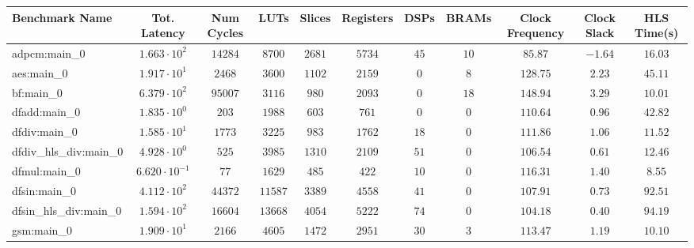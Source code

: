 \begin{tabular}{|l|c|c|c|c|c|c|c|c|c|c|}
\hline
Benchmark Name          & Tot. Latency            & Num Cycles & LUTs      & Slices    & Registers & DSPs    & BRAMs   & Clock Frequency & Clock Slack & HLS Time(s) \\
\hline
adpcm:main\_0           & $ 1.663 \cdot 10^{2}  $ & $ 14284  $ & $ 8700  $ & $ 2681  $ & $ 5734  $ & $ 45  $ & $ 10  $ & $ 85.87       $ & $ -1.64   $ & $ 16.03   $ \\
aes:main\_0             & $ 1.917 \cdot 10^{1}  $ & $ 2468   $ & $ 3600  $ & $ 1102  $ & $ 2159  $ & $ 0   $ & $ 8   $ & $ 128.75      $ & $ 2.23    $ & $ 45.11   $ \\
bf:main\_0              & $ 6.379 \cdot 10^{2}  $ & $ 95007  $ & $ 3116  $ & $ 980   $ & $ 2093  $ & $ 0   $ & $ 18  $ & $ 148.94      $ & $ 3.29    $ & $ 10.01   $ \\
dfadd:main\_0           & $ 1.835 \cdot 10^{0}  $ & $ 203    $ & $ 1988  $ & $ 603   $ & $ 761   $ & $ 0   $ & $ 0   $ & $ 110.64      $ & $ 0.96    $ & $ 42.82   $ \\
dfdiv:main\_0           & $ 1.585 \cdot 10^{1}  $ & $ 1773   $ & $ 3225  $ & $ 983   $ & $ 1762  $ & $ 18  $ & $ 0   $ & $ 111.86      $ & $ 1.06    $ & $ 11.52   $ \\
dfdiv\_hls\_div:main\_0 & $ 4.928 \cdot 10^{0}  $ & $ 525    $ & $ 3985  $ & $ 1310  $ & $ 2109  $ & $ 51  $ & $ 0   $ & $ 106.54      $ & $ 0.61    $ & $ 12.46   $ \\
dfmul:main\_0           & $ 6.620 \cdot 10^{-1} $ & $ 77     $ & $ 1629  $ & $ 485   $ & $ 422   $ & $ 10  $ & $ 0   $ & $ 116.31      $ & $ 1.40    $ & $ 8.55    $ \\
dfsin:main\_0           & $ 4.112 \cdot 10^{2}  $ & $ 44372  $ & $ 11587 $ & $ 3389  $ & $ 4558  $ & $ 41  $ & $ 0   $ & $ 107.91      $ & $ 0.73    $ & $ 92.51   $ \\
dfsin\_hls\_div:main\_0 & $ 1.594 \cdot 10^{2}  $ & $ 16604  $ & $ 13668 $ & $ 4054  $ & $ 5222  $ & $ 74  $ & $ 0   $ & $ 104.18      $ & $ 0.40    $ & $ 94.19   $ \\
gsm:main\_0             & $ 1.909 \cdot 10^{1}  $ & $ 2166   $ & $ 4605  $ & $ 1472  $ & $ 2951  $ & $ 30  $ & $ 3   $ & $ 113.47      $ & $ 1.19    $ & $ 10.10   $ \\

\end{tabular}
